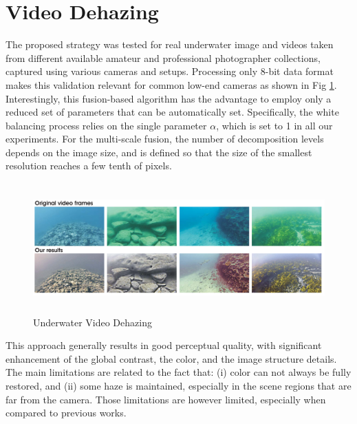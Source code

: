 \documentclass[hidelinks, 12pt]{report}
\begin{document}
\section{Video Dehazing}
The proposed strategy was tested for real underwater image and videos taken from different available amateur and professional photographer collections, captured using various cameras and setups. Processing only 8-bit data format makes this validation relevant for common
low-end cameras as shown in Fig \ref{Video}. Interestingly, this fusion-based algorithm has the advantage to employ only a reduced set of parameters that can be automatically set. Specifically, the white balancing process relies on the single parameter $\alpha$, which is set to 1 in all our experiments. For the multi-scale fusion, the number of decomposition levels depends on the image size, and is defined so that the size of the smallest resolution reaches a few tenth of pixels.
\begin{figure}[H]
\centering
\includegraphics[width=15cm,height=5cm]{Video.png}
\caption[Underwater Video Dehazing]{Underwater Video Dehazing}
\label{Video}
\end{figure}
This approach generally results in good perceptual quality, with significant enhancement of the global contrast, the color, and the image structure details. The main limitations are related to the fact that: (i) color can not always be fully restored, and (ii) some haze is maintained, especially in the scene regions that are far from the camera. Those limitations are however limited, especially when compared to previous works.\cite{ag}
\end{document}
